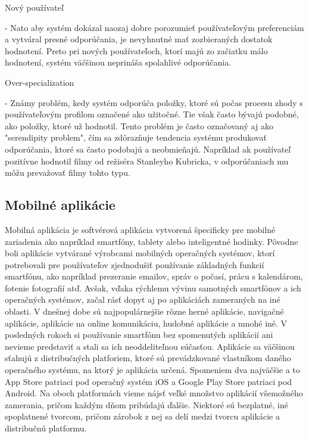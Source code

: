 \begin{itemize}[leftmargin=*]
	{\bf \item Nový používateľ} - Nato aby systém dokázal naozaj dobre porozumieť používateľovým preferenciám a vytváral presné odporúčania, je nevyhnutné mať zozbieraných dostatok hodnotení. Preto pri nových používateľoch, ktorí majú zo začiatku málo hodnotení, systém väčšinou neprináša spolahlivé odporúčania. 
	{\bf \item Over-specialization} - Známy problém, kedy systém odporúča položky, ktoré sú počas procesu zhody s používateľovým profilom označené ako užitočné. Tie však často bývajú podobné, ako položky, ktoré už hodnotil. Tento problém je často označovaný aj ako "serendipity problem", čím sa zdôrazňuje tendencia systému produkovať odporúčania, ktoré sa často podobajú a neobmieňajú. Napríklad ak používateľ pozitívne hodnotil filmy od režiséra Stanleyho Kubricka, v odporúčaniach mu môžu prevažovať filmy tohto typu. \\
	
\end{itemize}


\subsection{Mobilné aplikácie}
Mobilná aplikácia je softvérová aplikácia vytvorená špecificky pre mobilné zariadenia ako napríklad smartfóny, tablety alebo inteligentné hodinky. Pôvodne boli aplikácie vytvárané výrobcami mobilných operačných systémov, ktorí potrebovali pre používateľov zjednodušiť používanie základných funkcií smartfónu, ako napríklad prezeranie emailov, správ o počasí, prácu s kalendárom, fotenie fotografií atď. Avšak, vďaka rýchlemu vývinu samotných smartfónov a ich operačných systémov, začal rásť dopyt aj po aplikáciách zameraných na iné oblasti. V dnešnej dobe sú najpopulárnejšie rôzne herné aplikácie, navigačné aplikácie, aplikácie na online komunikáciu, hudobné aplikácie a mnohé iné. V posledných rokoch si používanie smartfónu bez spomenutých aplikácií ani nevieme predstaviť a stali sa ich neoddeliteľnou súčasťou. Aplikácie sa väčšinou sťahujú z distribučných platforiem, ktoré sú prevádzkované vlastníkom daného operačného systému, na ktorý je aplikácia určená. Spomeniem dva najväčšie a to App Store patriaci pod operačný systém iOS a Google Play Store patriaci pod Android. Na oboch platformách vieme nájsť veľké množstvo aplikácií všemožného zamerania, pričom každým dňom pribúdajú ďalšie. Niektoré sú bezplatné, iné spoplatnené tvorcom, pričom zárobok z nej sa delí medzi tvorcu aplikácie a distribučnú platformu. \\
